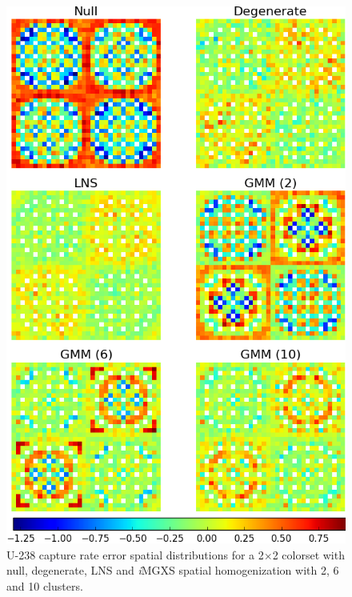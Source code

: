 \begin{figure}[h!]
\centering
\includegraphics[width=0.9\linewidth]{figures/results/spatial/2x2/capt-err}
\vspace{2mm}
\caption[U-238 capture rate errors for a 2$\times$2 colorset]{U-238 capture rate error spatial distributions for a 2$\times$2 colorset with null, degenerate, \ac{LNS} and \textit{i}\ac{MGXS} spatial homogenization with 2, 6 and 10 clusters.}
\label{fig:chap11-2x2-capt-rates}
\end{figure}

\clearpage

